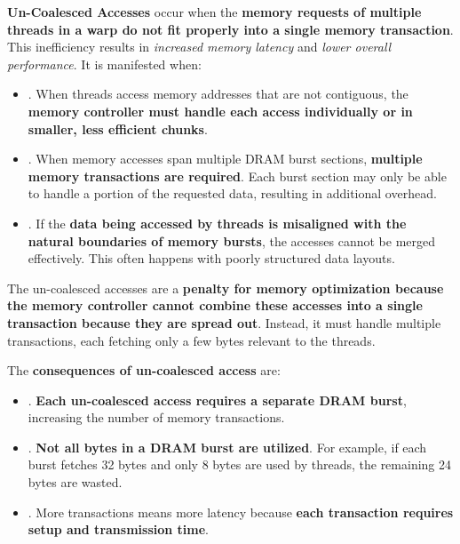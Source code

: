 \highspace
\textbf{Un-Coalesced Accesses} occur when the \textbf{memory requests of multiple threads in a warp do not fit properly into a single memory transaction}. This inefficiency results in \emph{increased memory latency} and \emph{lower overall performance}. It is manifested when:
\begin{itemize}
    \item {}. When threads access memory addresses that are not contiguous, the \textbf{memory controller must handle each access individually or in smaller, less efficient chunks}.
    
    \item {}. When memory accesses span multiple DRAM burst sections, \textbf{multiple memory transactions are required}. Each burst section may only be able to handle a portion of the requested data, resulting in additional overhead.

    \item {}. If the \textbf{data being accessed by threads is misaligned with the natural boundaries of memory bursts}, the accesses cannot be merged effectively. This often happens with poorly structured data layouts.
\end{itemize}
The un-coalesced accesses are a \textbf{penalty for memory optimization because the memory controller cannot combine these accesses into a single transaction because they are spread out}. Instead, it must handle multiple transactions, each fetching only a few bytes relevant to the threads.

\highspace
The \textbf{consequences of un-coalesced access} are:
\begin{itemize}
    \item {}. \textbf{Each un-coalesced access requires a separate DRAM burst}, increasing the number of memory transactions.

    \item {}. \textbf{Not all bytes in a DRAM burst are utilized}. For example, if each burst fetches 32 bytes and only 8 bytes are used by threads, the remaining 24 bytes are wasted.

    \item {}. More transactions means more latency because \textbf{each transaction requires setup and transmission time}.
\end{itemize}

